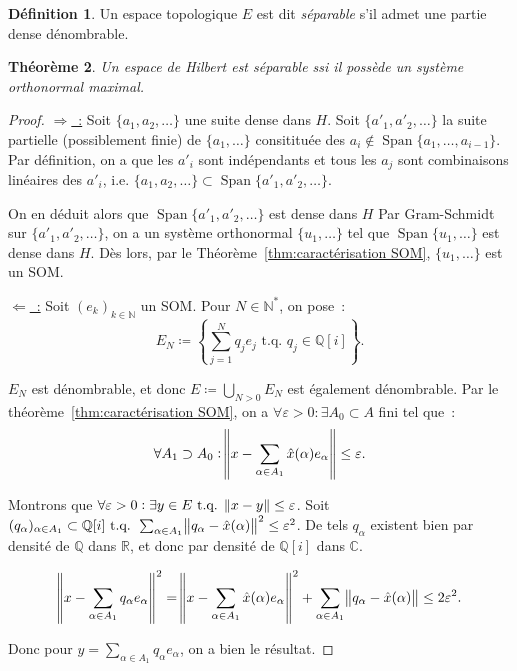 \documentclass{report}
\DeclareMathOperator{\Span}{Span}
\newcommand{\C}{{\mathbb C}}
\newcommand{\R}{{\mathbb R}}
\newcommand{\Q}{{\mathbb Q}}
\newcommand{\N}{{\mathbb N}}
\newcommand{\tq}{\text{ t.q. }}
\newcommand{\st}{\tq}
\newtheorem{thm}{Théorème}[chapter]
\theoremstyle{definition}
\newtheorem{déf}[thm]{Définition}
\theoremstyle{remark}
\begin{document}
\begin{déf} Un espace topologique $E$ est dit \textit{séparable} s'il admet une partie dense dénombrable.
\end{déf}

\begin{thm} Un espace de Hilbert est séparable ssi il possède un système orthonormal maximal.
\end{thm}

\begin{proof} \underline {$\Rightarrow$~:} Soit $\{a_1, a_2, \ldots\}$ une suite dense dans $H$. Soit $\{a'_1, a'_2, \ldots\}$ la suite partielle (possiblement finie) de
$\{a_1, \ldots\}$ consitituée des $a_i \not \in \Span\{a_1, \ldots, a_{i-1}\}$. Par définition, on a que les $a'_i$ sont indépendants et tous les $a_j$ sont combinaisons linéaires
des $a'_i$, i.e. $\{a_1, a_2, \ldots\} \subset \Span\{a'_1, a'_2, \ldots\}$.

On en déduit alors que $\Span\{a'_1, a'_2, \ldots\}$ est dense dans $H$ Par Gram-Schmidt sur $\{a'_1, a'_2, \ldots\}$, on a un système orthonormal $\{u_1, \ldots\}$ tel que
$\Span\{u_1, \ldots\}$ est dense dans $H$. Dès lors, par le Théorème~\ref{thm:caractérisation SOM}, $\{u_1, \ldots\}$ est un SOM.

\underline {$\Leftarrow$~:} Soit $(e_k)_{k \in \N}$ un SOM. Pour $N \in \N^*$, on pose~:
\[E_N \coloneqq \left\{\sum_{j=1}^Nq_je_j \tq q_j \in \Q[i]\right\}.\]

$E_N$ est dénombrable, et donc $E \coloneqq \bigcup_{N > 0}E_N$ est également dénombrable. Par le théorème~\ref{thm:caractérisation SOM}, on a
$\forall \varepsilon > 0 : \exists A_0 \subset A$ fini tel que~:
\[\forall A_1 \supset A_0 : \norm {x-\sum_{\alpha \in A_1}\hat x(\alpha)e_\alpha} \leq \varepsilon.\]

Montrons que $\forall \varepsilon > 0 : \exists y \in E \st \norm {x-y} \leq \varepsilon$.
Soit $(q_\alpha)_{\alpha \in A_1} \subset \Q[i] \st \sum_{\alpha \in A_1}\norm {q_\alpha - \hat x(\alpha)}^2 \leq \varepsilon^2$. De tels $q_\alpha$ existent bien par densité
de $\Q$ dans $\R$, et donc par densité de $\Q[i]$ dans $\C$.

\[\norm {x - \sum_{\alpha \in A_1}q_\alpha e_\alpha}^2 = \norm {x-\sum_{\alpha \in A_1}\hat x(\alpha)e_\alpha}^2 + \sum_{\alpha \in A_1}\norm {q_\alpha - \hat x(\alpha)} \leq 2\varepsilon^2.\]

Donc pour $y = \sum_{\alpha \in A_1}q_\alpha e_\alpha$, on a bien le résultat.
\end{proof}
\end{document}
